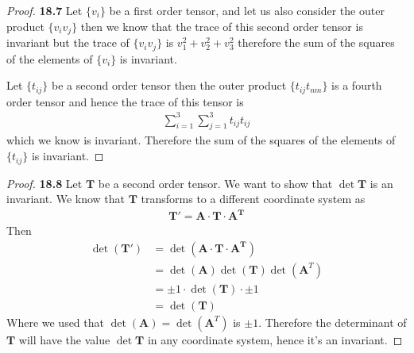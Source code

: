 \documentclass[11pt]{article}
\theoremstyle{definition}
\begin{document}
\cleardoublepage
\begin{proof}{\textbf{18.7}}
    Let $\{v_i\}$ be a first order tensor, and let us also consider the outer
    product $\{v_iv_j\}$ then we know that the trace of this second order
    tensor is invariant but the trace of $\{v_iv_j\}$ is $v_1^2 + v_2^2 +v_3^2$
    therefore the sum of the squares of the elements of $\{v_i\}$ is invariant.

    Let $\{t_{ij}\}$ be a second order tensor then the outer product
    $\{t_{ij}t_{nm}\}$ is a fourth order tensor and hence the trace of this
    tensor is 
    \begin{align*}
        \sum_{i=1}^3\sum_{j=1}^3 t_{ij}t_{ij}
    \end{align*}
    which we know is invariant. Therefore the sum of the squares of the
    elements of $\{t_{ij}\}$ is invariant.
\end{proof}
\begin{proof}{\textbf{18.8}}
    Let $\bm{T}$ be a second order tensor. We want to show that $\det \bm{T}$
    is an invariant. We know that $\bm{T}$ transforms to a different coordinate
    system as
    \begin{align*}
        \bm{T'} = \bm{A \cdot T\cdot A^{T}}
    \end{align*}
    Then
    \begin{align*}
        \det (\bm{T'}) &= \det (\bm{A \cdot T\cdot A^{T}})\\
            &= \det (\bm{A})\det(\bm{T})\det(\bm A^{T})\\
            &= \pm 1\cdot\det(\bm{T})\cdot \pm 1\\
            &= \det(\bm{T})
    \end{align*}
    Where we used that $\det (\bm{A}) = \det (\bm{A}^T)$ is $\pm 1$.
    Therefore the determinant of $\bm{T}$ will have the value $\det\bm{T}$ in
    any coordinate system, hence it's an invariant.
\end{proof}
\cleardoublepage
\end{document}

